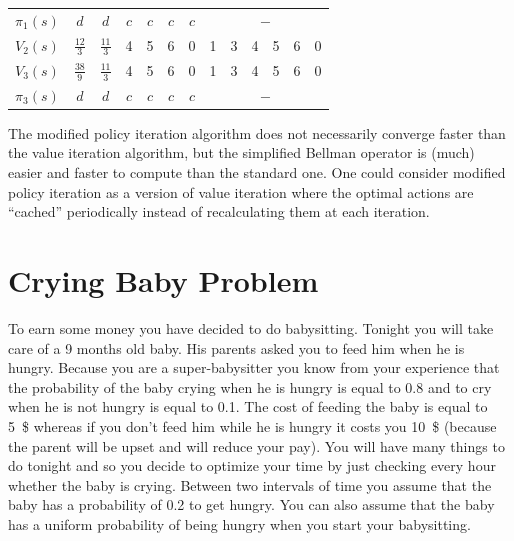 \documentclass[11pt, a4paper]{article}
\begin{document}
\begin{enumerate}
\begin{solution}
\begin{itemize}
\begin{table}[H]
\begin{tabular}{c|cccccc|cccccc}
                    $\pi_1(s)$ & $d$ & $d$ & $c$ & $c$ & $c$ & $c$ & \multicolumn{6}{c}{$-$} \\
                    $V_2(s)$   & $\frac{12}{3}$ & $\frac{11}{3}$ & 4 & 5 & 6 & 0 & 1 & 3 & 4 & 5 & 6 & 0 \\
                    $V_3(s)$   & $\frac{38}{9}$ & $\frac{11}{3}$ & 4 & 5 & 6 & 0 & 1 & 3 & 4 & 5 & 6 & 0 \\
                    $\pi_3(s)$ & $d$ & $d$ & $c$ & $c$ & $c$ & $c$ & \multicolumn{6}{c}{$-$} \\
                    \bottomrule
                \end{tabular}
            \end{table}
            The modified policy iteration algorithm does not necessarily converge faster than the value iteration algorithm, but the simplified Bellman operator is (much) easier and faster to compute than the standard one. One could consider modified policy iteration as a version of value iteration where the optimal actions are \enquote{cached} periodically instead of recalculating them at each iteration.
        \end{itemize}
    \end{solution}
\end{enumerate}

\newpage

\section{Crying Baby Problem}

To earn some money you have decided to do babysitting. Tonight you will take care of a 9 months old baby. His parents asked you to feed him when he is hungry. Because you are a super-babysitter you know from your experience that the probability of the baby crying when he is hungry is equal to 0.8 and to cry when he is not hungry is equal to 0.1. The cost of feeding the baby is equal to \SI{5}{\$} whereas if you don't feed him while he is hungry it costs you \SI{10}{\$} (because the parent will be upset and will reduce your pay). You will have many things to do tonight and so you decide to optimize your time by just checking every hour whether the baby is crying. Between two intervals of time you assume that the baby has a probability of 0.2 to get hungry. You can also assume that the baby has a uniform probability of being hungry when you start your babysitting.
\end{document}
